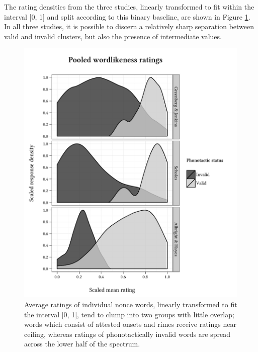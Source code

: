 The rating densities from the three studies, linearly transformed to fit within the interval [0, 1] and split according to this binary baseline, are shown in Figure \ref{dsn}. In all three studies, it is possible to discern a relatively sharp separation between valid and invalid clusters, but also the presence of intermediate values.

\begin{figure} 
\centering
\includegraphics{density.pdf}
\caption{Average ratings of individual nonce words, linearly transformed to fit the interval [0, 1], tend to clump into two groups with little overlap; words which consist of  attested onsets and rimes receive ratings near ceiling, whereas ratings of phonotactically invalid words are spread across the lower half of the spectrum.}
\label{dsn}
\end{figure}

